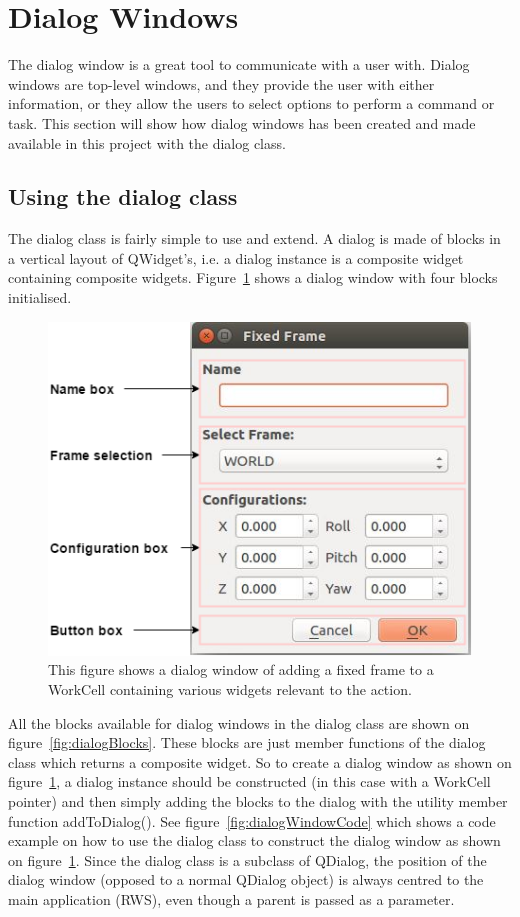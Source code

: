 \section{Dialog Windows}
\label{sec:DialogWindows}
The dialog window is a great tool to communicate with a user with. Dialog windows are top-level windows, and they provide the user with either information, or they allow the users to select options to perform a command or task. This section will show how dialog windows has been created and made available in this project with the dialog class.\\

\subsection{Using the dialog class}
\label{sec:usingTheDialogClass}
The dialog class is fairly simple to use and extend. A dialog is made of blocks in a vertical layout of QWidget's, i.e. a dialog instance is a composite widget containing composite widgets. Figure~\ref{fig:dialogWindowExample} shows a dialog window with four blocks initialised.

\begin{figure}[h]
	\centering
	\includegraphics[scale=0.55]{Figures/dialogclassblocks.png}
	\caption{This figure shows a dialog window of adding a fixed frame to a WorkCell containing various widgets relevant to the action. }
	\label{fig:dialogWindowExample}
\end{figure}

All the blocks available for dialog windows in the dialog class are shown on figure~\ref{fig:dialogBlocks}. These blocks are just member functions of the dialog class which returns a composite widget. So to create a dialog window as shown on figure~\ref{fig:dialogWindowExample}, a dialog instance should be constructed (in this case with a WorkCell pointer) and then simply adding the blocks to the dialog with the utility member function addToDialog(). See figure~\ref{fig:dialogWindowCode} which shows a code example on how to use the dialog class to construct the dialog window as shown on figure~\ref{fig:dialogWindowExample}. Since the dialog class is a subclass of QDialog, the position of the dialog window (opposed to a normal QDialog object) is always centred to the main application (RWS), even though a parent is passed as a parameter.

